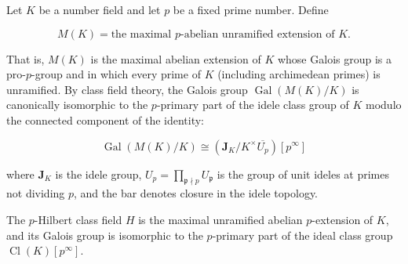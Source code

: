 Let $K$ be a number field and let $p$ be a fixed prime number. Define

$$
M(K) = \text{the maximal } p\text{-abelian unramified extension of } K.
$$

That is, $M(K)$ is the maximal abelian extension of $K$ whose Galois group is a pro-$p$-group and in which every prime of $K$ (including archimedean primes) is unramified. By class field theory, the Galois group $\operatorname{Gal}(M(K)/K)$ is canonically isomorphic to the $p$-primary part of the idele class group of $K$ modulo the connected component of the identity:

$$
\operatorname{Gal}(M(K)/K) \cong \left( \mathbf{J}_K / K^\times \overline{U_p} \right)[p^\infty]
$$

where $\mathbf{J}_K$ is the idele group, $U_p = \prod_{\mathfrak{p} \nmid p} U_\mathfrak{p}$ is the group of unit ideles at primes not dividing $p$, and the bar denotes closure in the idele topology.

The $p$-Hilbert class field $H$ is the maximal unramified abelian $p$-extension of $K$, and its Galois group is isomorphic to the $p$-primary part of the ideal class group $\operatorname{Cl}(K)[p^\infty]$.
